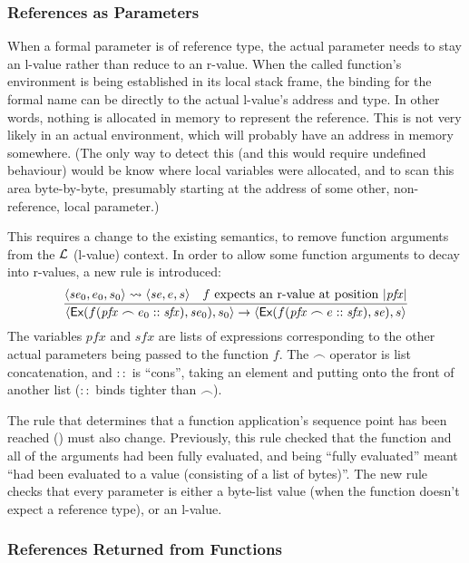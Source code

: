 \documentclass[11pt]{article}
\begin{document}
\subsubsection{References as Parameters}

When a formal parameter is of reference type, the actual parameter
needs to stay an l-value rather than reduce to an r-value.  When the
called function's environment is being established in its local stack
frame, the binding for the formal name can be directly to the actual
l-value's address and type.  In other words, nothing is allocated in
memory to represent the reference.  This is not very likely in an
actual environment, which will probably have an address in memory
somewhere.  (The only way to detect this (and this would require
undefined behaviour) would be know where local variables were
allocated, and to scan this area byte-by-byte, presumably starting at
the address of some other, non-reference, local parameter.)

This requires a change to the existing semantics, to remove function
arguments from the $\cal L$ (l-value) context.  In order to allow some
function arguments to decay into r-values, a new rule
 is introduced:
\[
\infer{
  \statebrack{\textsf{Ex}(f(\mathit{pfx} \frown e_0 ::
    \mathit{sfx}),
    \mathit{se}_0),s_0}
  \rightarrow
  \statebrack{\textsf{Ex}(f(\mathit{pfx}\frown e ::
    \mathit{sfx}),\mathit{se}),
    s}}{%
  \statebrack{\mathit{se}_0,e_0,s_0}\lvtorv\statebrack{\mathit{se},e,s} &
  f\mbox{ expects an r-value at position }|\mathit{pfx}|}
\]
The variables $\mathit{pfx}$ and $\mathit{sfx}$ are lists of
expressions corresponding to the other actual parameters being passed
to the function $f$.  The $\frown$ operator is list concatenation, and
$::$ is ``cons'', taking an element and putting onto the front of
another list ($::$ binds tighter than $\frown$).

The rule that determines that a function application's sequence point
has been reached () must also change.
Previously, this rule checked that the function and all of the
arguments had been fully evaluated, and being ``fully evaluated''
meant ``had been evaluated to a value (consisting of a list of
bytes)''.  The new rule checks that every parameter is either a
byte-list value (when the function doesn't expect a reference type),
or an l-value.

\subsubsection{References Returned from Functions}
\end{document}
